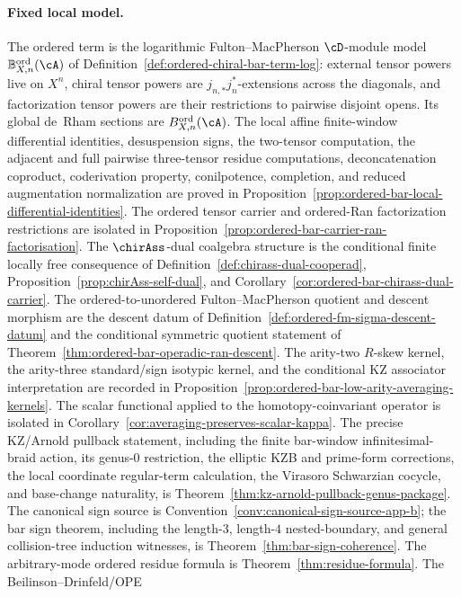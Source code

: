 \paragraph{Fixed local model.}
The ordered term is the logarithmic Fulton--MacPherson
$\cD$-module model
\(\mathbb B^{\mathrm{ord}}_{X,n}(\cA)\) of
Definition~\ref{def:ordered-chiral-bar-term-log}: external tensor
powers live on $X^n$, chiral tensor powers are
$j_{n,*}j_n^*$-extensions across the diagonals, and factorization
tensor powers are their restrictions to pairwise disjoint opens. Its
global de~Rham sections are \(B^{\mathrm{ord}}_{X,n}(\cA)\). The local
affine finite-window differential identities, desuspension signs, the
two-tensor computation, the adjacent and full pairwise three-tensor
residue computations, deconcatenation coproduct, coderivation property,
conilpotence, completion, and reduced augmentation normalization are
proved in
Proposition~\ref{prop:ordered-bar-local-differential-identities}.
The ordered tensor carrier and ordered-Ran factorization restrictions
are isolated in
Proposition~\ref{prop:ordered-bar-carrier-ran-factorisation}. The
$\chirAss$-dual coalgebra structure is the conditional finite
locally free consequence
of Definition~\ref{def:chirass-dual-cooperad},
Proposition~\ref{prop:chirAss-self-dual}, and
Corollary~\ref{cor:ordered-bar-chirass-dual-carrier}. The
ordered-to-unordered Fulton--MacPherson quotient and descent morphism
are the descent datum of
Definition~\ref{def:ordered-fm-sigma-descent-datum} and the
conditional symmetric quotient statement of
Theorem~\ref{thm:ordered-bar-operadic-ran-descent}. The arity-two
\(R\)-skew kernel, the arity-three standard/sign isotypic kernel, and
the conditional KZ associator interpretation are recorded in
Proposition~\ref{prop:ordered-bar-low-arity-averaging-kernels}.
The scalar functional applied to the homotopy-coinvariant operator is isolated in
Corollary~\ref{cor:averaging-preserves-scalar-kappa}. The precise
KZ/Arnold pullback statement, including the finite bar-window
infinitesimal-braid action, its genus-$0$ restriction, the elliptic
KZB and prime-form corrections, the local coordinate regular-term
calculation, the Virasoro Schwarzian cocycle, and base-change
naturality, is
Theorem~\ref{thm:kz-arnold-pullback-genus-package}. The canonical sign
source is Convention~\ref{conv:canonical-sign-source-app-b}; the bar
sign theorem, including the length-$3$, length-$4$ nested-boundary, and
general collision-tree induction witnesses, is
Theorem~\ref{thm:bar-sign-coherence}. The
arbitrary-mode ordered residue formula is
Theorem~\ref{thm:residue-formula}. The Beilinson--Drinfeld/OPE
